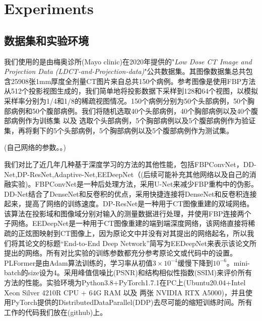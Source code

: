 \section{Experiments}
\subsection{数据集和实验环境}
我们使用的是由梅奥诊所(Mayo clinic)在2020年提供的"\emph{Low Dose CT Image and Projection Data (LDCT-and-Projection-data)}"\cite{moen2021low}公共数据集。其图像数据集总共包含25908张1mm厚度全剂量CT图片来自总共150个病例。参考图像是使用FBP方法从512个投影视图生成的，我们简单地将投影数据下采样到128和64个视图，以模拟采样率分别为1/4和1/8的稀疏视图情况。150个病例分别为50个头部病例，50个胸部病例和50个腹部病例。我们将随机选取40个头部病例，40个胸部病例以及40个腹部病例作为训练集 以及 选取个头部病例，5个胸部病例以及5个腹部病例作为验证集，再将剩下的5个头部病例，5个胸部病例以及5个腹部病例作为测试集。\par
(自己网络的参数。。)\par
我们对比了近几年几种基于深度学习的方法的其他性能，包括FBPConvNet\cite{2016FBPConvNet}，DD-Net\cite{2018DDNet},DP-ResNet\cite{2019DP-ResNet},Adaptive-Net\cite{2020ADAPTIVE},EEDeepNet\cite{2020An}（(后续可能补充其他网络以及自己的消融实验)。FBPConvNet是一种后处理方法，采用U-Net\cite{2015Unet}来减少FBP重构中的伪影。DD-Net结合了DenseNet\cite{2016DenseNet}和反卷积的优点，采用快捷连接将DenseNet和反卷积连接起来，提高了网络的训练速度。DP-ResNet是一种用于CT图像重建的双域网络。该算法在投影域和图像域分别对输入的测量数据进行处理，并使用FBP连接两个子网络。EEDeepNet是一种用于CT图像重建的端到端深度网络，该网络直接将稀疏的正炫图映射到CT图像上，因为原论文中并没有对其提出的网络起名，所以我们将其论文的标题“End-to-End Deep Network”简写为EEDeepNet来表示该论文所提出的网络。所有对比实验的训练参数都充分参考原论文或代码中的设置。PLFormer是由Adam算法\cite{2014Adam}训练的，学习率从初值$3\times10^{-4}$缓慢下降到$10^{-6}$。mini-batch的size设为4。采用峰值信噪比(PSNR)和结构相似性指数(SSIM)来评价所有方法的性能。实验环境为Python3.8+PyTorch1.7.1在PC上(Ubuntu20.04+Intel Xeon Silver 4210R CPU + 64G RAM 以及 两张 NVIDIA RTX A5000)，并且使用PyTorch提供的DistributedDataParallel(DDP)去尽可能的缩短训练时间。所有工作的代码我们放在(github)上。\par
